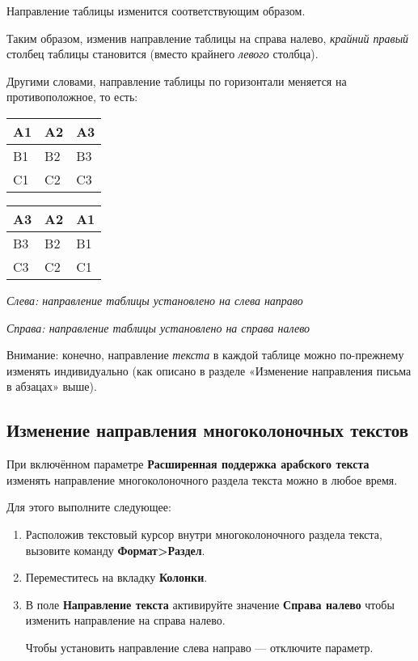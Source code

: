 ﻿\documentclass[a4paper,10pt]{article}
\begin{document}
 Направление таблицы изменится соответствующим образом.
 
 Таким образом, изменив направление таблицы на справа налево, \textit{крайний правый} столбец таблицы становится (вместо крайнего \textit{левого} столбца).
 
 Другими словами, направление таблицы по горизонтали меняется на противоположное, то есть:
 \newline
 \newline
 \begin{tabular}{ | m{1cm} | m{1cm} | m{1cm} |}
\hline
 A1 & A2 & A3\\ 
 \hline
 B1 & B2 & B3\\
\hline
C1 & C2 & C3\\
\hline
\end{tabular}
 \quad
  \begin{tabular}{ | m{1cm} | m{1cm} | m{1cm} |}
\hline
 A3 & A2 & A1\\ 
 \hline
 B3 & B2 & B1\\
\hline
C3 & C2 & C1\\
\hline
\end{tabular}

{\footnotesize \textit{Слева: направление таблицы установлено на слева направо}}

{\footnotesize \textit{Справа: направление таблицы установлено на справа налево}}

Внимание: конечно, направление \textit{текста} в каждой таблице можно по-прежнему изменять индивидуально (как описано в разделе «Изменение направления письма в абзацах» выше).

 \subsection{Изменение направления многоколоночных текстов}
 При включённом параметре \textbf{Расширенная поддержка арабского текста} изменять направление многоколоночного раздела текста можно в любое время.
 
 Для этого выполните следующее:
 \begin{enumerate}
  \item Расположив текстовый курсор внутри многоколоночного раздела текста, вызовите команду \textbf{Формат>Раздел}.
  \item Переместитесь на вкладку \textbf{Колонки}.
  \item В поле \textbf{Направление текста} активируйте значение \textbf{Справа налево} чтобы изменить направление на справа налево.
  
  Чтобы установить направление слева направо — отключите параметр.
 \end{enumerate}
\end{document}
